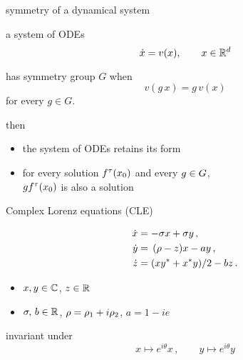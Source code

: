 \begin{frame}{symmetry of a dynamical system}






\begin{block}{a system of ODEs}
 \[
  \dot{x}=v(x), \qquad x\in \mathbb{R}^{d}
 \]
\end{block}

\begin{block}{has symmetry group $G$ when}
 \[
  v(g\,x)=g\,v(x)
 \]
 for every $g\in G$.
\end{block}


\begin{block}{then}
  \begin{itemize}
  \item the system of ODEs retains its form
  \item for every solution $f^{\tau}(x_0)$ and every $g \in G$,\\
      $g f^{\tau}(x_0)$ is also a solution 
  \end{itemize}
\end{block}
\end{frame}


\begin{frame}{Complex Lorenz equations (CLE)}
  \begin{exampleblock}{}
	\begin{align*}
	  \dot{x} &= -\sigma x+ \sigma y \,,\nonumber \\ 
	  \dot{y} &=\, (\rho-z)x-a y\,, \nonumber \\ 
	  \dot{z} &= (x y^*+x^*y)/2 -b z\,.
	\end{align*}
  \end{exampleblock}
  \begin{block}{}
     \begin{itemize}
	  \item $x,y\in\mathbb{C}^{}$, $z\in\mathbb{R}^{}$
	  \item $\sigma,\,b \in \mathbb{R}^{}$, $\rho=\rho_1+i\rho_2$, $a=1-i e$
	  \end{itemize}
  \end{block}
  \begin{block}{invariant under}
    \[
      x\mapsto e^{i\theta}x\,, \qquad y\mapsto e^{i\theta}y
    \]
  \end{block}
\end{frame}


